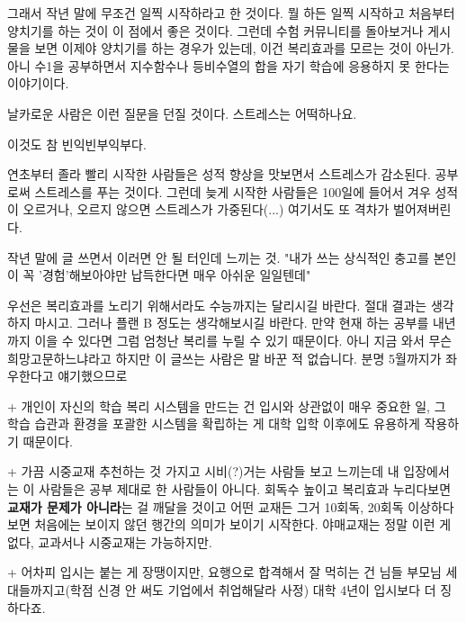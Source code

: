 그래서 작년 말에 무조건 일찍 시작하라고 한 것이다. 뭘 하든 일찍 시작하고 처음부터 양치기를 하는 것이 이 점에서 좋은 것이다.
그런데 수험 커뮤니티를 돌아보거나 게시물을 보면 이제야 양치기를 하는 경우가 있는데, 이건 복리효과를 모르는 것이 아닌가.
아니 수1을 공부하면서 지수함수나 등비수열의 합을 자기 학습에 응용하지 못 한다는 이야기이다.
\vspace{5mm}

날카로운 사람은 이런 질문을 던질 것이다. 스트레스는 어떡하나요.
\vspace{5mm}

이것도 참 빈익빈부익부다.
\vspace{5mm}

연초부터 졸라 빨리 시작한 사람들은 성적 향상을 맛보면서 스트레스가 감소된다. 공부로써 스트레스를 푸는 것이다.
그런데 늦게 시작한 사람들은 100일에 들어서 겨우 성적이 오르거나, 오르지 않으면 스트레스가 가중된다(...)
여기서도 또 격차가 벌어져버린다.
\vspace{5mm}

작년 말에 글 쓰면서 이러면 안 될 터인데 느끼는 것.
"내가 쓰는 상식적인 충고를 본인이 꼭 '경험'해보아야만 납득한다면 매우 아쉬운 일일텐데"
\vspace{5mm}

우선은 복리효과를 노리기 위해서라도 수능까지는 달리시길 바란다. 절대 결과는 생각하지 마시고.
그러나 플랜 B 정도는 생각해보시길 바란다. 만약 현재 하는 공부를 내년까지 이을 수 있다면 그럼 엄청난 복리를 누릴 수 있기 때문이다.
아니 지금 와서 무슨 희망고문하느냐라고 하지만 이 글쓰는 사람은 말 바꾼 적 없습니다.
분명 5월까지가 좌우한다고 얘기했으므로
\vspace{5mm}

+ 개인이 자신의 학습 복리 시스템을 만드는 건 입시와 상관없이 매우 중요한 일,
그 학습 습관과 환경을 포괄한 시스템을 확립하는 게 대학 입학 이후에도 유용하게 작용하기 때문이다.
\vspace{5mm}

+ 가끔 시중교재 추천하는 것 가지고 시비(?)거는 사람들 보고 느끼는데 내 입장에서는 이 사람들은 공부 제대로 한 사람들이 아니다.
회독수 높이고 복리효과 누리다보면 \textbf{교재가 문제가 아니라}는 걸 깨달을 것이고
어떤 교재든 그거 10회독, 20회독 이상하다보면 처음에는 보이지 않던 행간의 의미가 보이기 시작한다.
야매교재는 정말 이런 게 없다, 교과서나 시중교재는 가능하지만.
\vspace{5mm}

+ 어차피 입시는 붙는 게 장땡이지만, 요행으로 합격해서 잘 먹히는 건 님들 부모님 세대들까지고(학점 신경 안 써도 기업에서 취업해달라 사정)
대학 4년이 입시보다 더 징하다죠.
\vspace{5mm}






